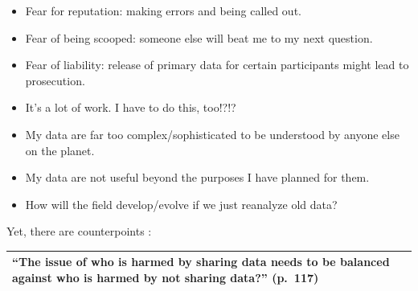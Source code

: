 \documentclass[
  english,
]{book}
\providecommand{\tightlist}{%
  \setlength{\itemsep}{0pt}\setlength{\parskip}{0pt}}
\begin{document}
\begin{itemize}
\tightlist
\item
  Fear for reputation: making errors and being called out.
\item
  Fear of being scooped: someone else will beat me to my next question.
\item
  Fear of liability: release of primary data for certain participants might lead to prosecution.
\item
  It's a lot of work. I have to do this, too!?!?
\item
  My data are far too complex/sophisticated to be understood by anyone else on the planet.
\item
  My data are not useful beyond the purposes I have planned for them.
\item
  How will the field develop/evolve if we just reanalyze old data?
\end{itemize}

Yet, there are counterpoints \citep{martone_data_2018}:

\begin{longtable}[]{@{}
  >{\centering\arraybackslash}p{}@{}}
\toprule
``The issue of who is harmed by sharing data needs to be balanced against who is harmed by not sharing data?'' (p.~117) \\
\midrule
\endhead
\bottomrule
\end{longtable}
\end{document}
